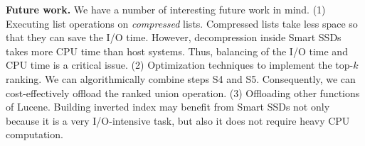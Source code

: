 

\textbf{Future work.}
We have a number of interesting future work in mind.
(1) Executing list operations on \emph{compressed} lists. Compressed lists take less space so that they can save the I/O time. However, decompression inside Smart SSDs takes more CPU time than host systems. Thus, balancing of the I/O time and CPU time is a critical issue. (2) Optimization techniques to implement the top-$k$ ranking. We can algorithmically combine steps S4 and S5. Consequently, we can cost-effectively offload the ranked union operation. (3) Offloading other functions of Lucene. Building inverted index may benefit from Smart SSDs not only because it is a very I/O-intensive task, but also it does not require heavy CPU computation.






%
%
